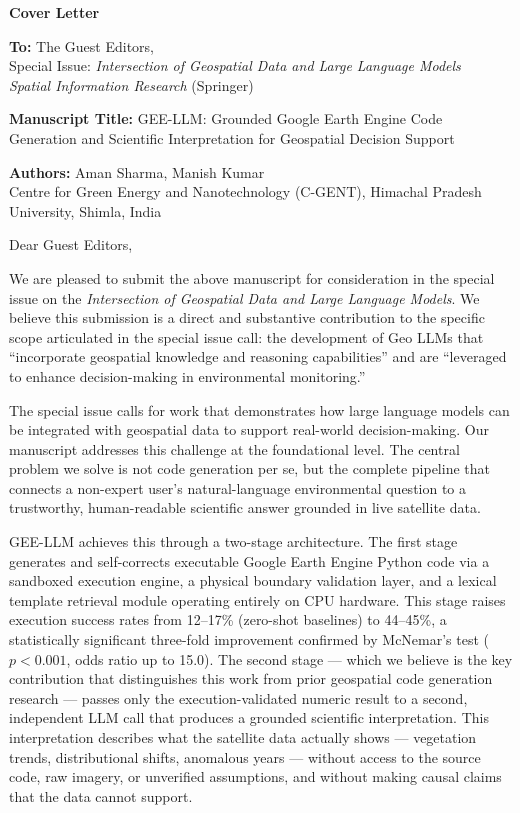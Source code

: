 \documentclass[12pt]{article}
\begin{document}
\textbf{Cover Letter}

\bigskip

\textbf{To:} The Guest Editors,\\
Special Issue: \textit{Intersection of Geospatial Data and Large Language Models}\\
\textit{Spatial Information Research} (Springer)

\bigskip

\textbf{Manuscript Title:} GEE-LLM: Grounded Google Earth Engine Code Generation and Scientific Interpretation for Geospatial Decision Support

\textbf{Authors:} Aman Sharma, Manish Kumar\\
Centre for Green Energy and Nanotechnology (C-GENT), Himachal Pradesh University, Shimla, India

\bigskip

Dear Guest Editors,

We are pleased to submit the above manuscript for consideration in the special issue on the \textit{Intersection of Geospatial Data and Large Language Models}. We believe this submission is a direct and substantive contribution to the specific scope articulated in the special issue call: the development of Geo LLMs that ``incorporate geospatial knowledge and reasoning capabilities'' and are ``leveraged to enhance decision-making in environmental monitoring.''

The special issue calls for work that demonstrates how large language models can be integrated with geospatial data to support real-world decision-making. Our manuscript addresses this challenge at the foundational level. The central problem we solve is not code generation per se, but the complete pipeline that connects a non-expert user's natural-language environmental question to a trustworthy, human-readable scientific answer grounded in live satellite data.

GEE-LLM achieves this through a two-stage architecture. The first stage generates and self-corrects executable Google Earth Engine Python code via a sandboxed execution engine, a physical boundary validation layer, and a lexical template retrieval module operating entirely on CPU hardware. This stage raises execution success rates from 12--17\% (zero-shot baselines) to 44--45\%, a statistically significant three-fold improvement confirmed by McNemar's test ($p < 0.001$, odds ratio up to 15.0). The second stage --- which we believe is the key contribution that distinguishes this work from prior geospatial code generation research --- passes only the execution-validated numeric result to a second, independent LLM call that produces a grounded scientific interpretation. This interpretation describes what the satellite data actually shows --- vegetation trends, distributional shifts, anomalous years --- without access to the source code, raw imagery, or unverified assumptions, and without making causal claims that the data cannot support.
\end{document}
